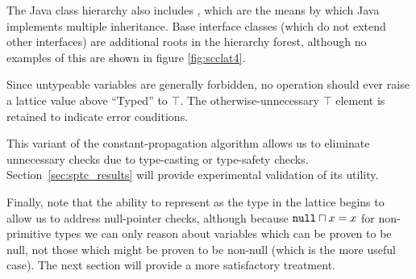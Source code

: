 \documentclass[12pt,titlepage,twoside]{article}
\newcommand{\meet}{\ensuremath{\sqcap}}
\begin{document}
The Java class hierarchy also includes , which are
the means by which Java implements multiple inheritance.  Base
interface classes (which do not extend other interfaces) are additional
roots in the hierarchy forest, although no examples of this are shown
in figure \ref{fig:scclat4}.

Since untypeable variables are generally forbidden, no operation
should ever raise a lattice value above ``Typed'' to $\top$.  The
otherwise-unnecessary $\top$ element is retained to indicate error
conditions.

This variant of the constant-propagation algorithm allows us to
eliminate unnecessary  checks due to type-casting or
type-safety checks.  Section~\ref{sec:sptc_results} will provide
experimental validation of its utility.

Finally, note that the ability to represent  as the
 type in the lattice begins to allow us to address
null-pointer checks, although because $\code{null} \meet x =x$ for
non-primitive types we can only reason about variables which can be
proven to be null, not those which might be proven to be non-null
(which is the more useful case).  The next section will provide a more
satisfactory treatment.
\end{document}
